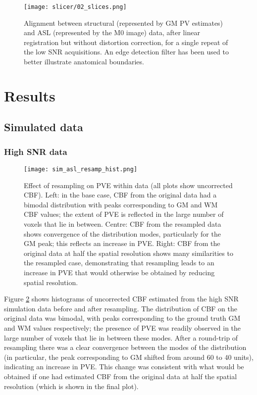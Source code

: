 \begin{figure}[H]
\centering
\texttt{[image: slicer/02\_slices.png]}
\caption{Alignment between structural (represented by GM PV estimates) and ASL (represented by the M0 image) data, after linear registration but without distortion correction, for a single repeat of the low SNR acquisitions. An edge detection filter has been used to better illustrate anatomical boundaries.}
\label{02_slices}
\end{figure}


\section{Results}

\subsection{Simulated data}

\subsubsection{High SNR data}

\begin{figure}[H]
\centering
\texttt{[image: sim\_asl\_resamp\_hist.png]}
\caption{Effect of resampling on PVE within data (all plots show uncorrected CBF). Left: in the base case, CBF from the original data had a bimodal distribution with peaks corresponding to GM and WM CBF values; the extent of PVE is reflected in the large number of voxels that lie in between. Centre: CBF from the resampled data shows convergence of the distribution modes, particularly for the GM peak; this reflects an increase in PVE. Right: CBF from the original data at half the spatial resolution shows many similarities to the resampled case, demonstrating that resampling leads to an increase in PVE that would otherwise be obtained by reducing spatial resolution.}
\label{sim_asl_resamp_hist}
\end{figure}

Figure \ref{sim_asl_resamp_hist} shows histograms of uncorrected CBF estimated from the high SNR simulation data before and after resampling. The distribution of CBF on the original data was bimodal, with peaks corresponding to the ground truth GM and WM values respectively; the presence of PVE was readily observed in the large number of voxels that lie in between these modes. After a round-trip of resampling there was a clear convergence between the modes of the distribution (in particular, the peak corresponding to GM shifted from around 60 to 40 units), indicating an increase in PVE. This change was consistent with what would be obtained if one had estimated CBF from the original data at half the spatial resolution (which is shown in the final plot). 

